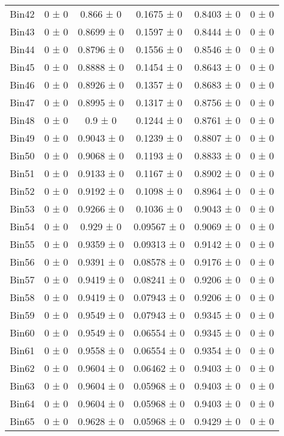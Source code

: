\begin{tabular}{@{\extracolsep{4pt}}lccccc@{}}
     Bin42 & 0 ± 0 & 0.866 ± 0 & 0.1675 ± 0 & 0.8403 ± 0 & 0 ± 0 \\ 
     Bin43 & 0 ± 0 & 0.8699 ± 0 & 0.1597 ± 0 & 0.8444 ± 0 & 0 ± 0 \\ 
     Bin44 & 0 ± 0 & 0.8796 ± 0 & 0.1556 ± 0 & 0.8546 ± 0 & 0 ± 0 \\ 
     Bin45 & 0 ± 0 & 0.8888 ± 0 & 0.1454 ± 0 & 0.8643 ± 0 & 0 ± 0 \\ 
     Bin46 & 0 ± 0 & 0.8926 ± 0 & 0.1357 ± 0 & 0.8683 ± 0 & 0 ± 0 \\ 
     Bin47 & 0 ± 0 & 0.8995 ± 0 & 0.1317 ± 0 & 0.8756 ± 0 & 0 ± 0 \\ 
     Bin48 & 0 ± 0 & 0.9 ± 0 & 0.1244 ± 0 & 0.8761 ± 0 & 0 ± 0 \\ 
     Bin49 & 0 ± 0 & 0.9043 ± 0 & 0.1239 ± 0 & 0.8807 ± 0 & 0 ± 0 \\ 
     Bin50 & 0 ± 0 & 0.9068 ± 0 & 0.1193 ± 0 & 0.8833 ± 0 & 0 ± 0 \\ 
     Bin51 & 0 ± 0 & 0.9133 ± 0 & 0.1167 ± 0 & 0.8902 ± 0 & 0 ± 0 \\ 
     Bin52 & 0 ± 0 & 0.9192 ± 0 & 0.1098 ± 0 & 0.8964 ± 0 & 0 ± 0 \\ 
     Bin53 & 0 ± 0 & 0.9266 ± 0 & 0.1036 ± 0 & 0.9043 ± 0 & 0 ± 0 \\ 
     Bin54 & 0 ± 0 & 0.929 ± 0 & 0.09567 ± 0 & 0.9069 ± 0 & 0 ± 0 \\ 
     Bin55 & 0 ± 0 & 0.9359 ± 0 & 0.09313 ± 0 & 0.9142 ± 0 & 0 ± 0 \\ 
     Bin56 & 0 ± 0 & 0.9391 ± 0 & 0.08578 ± 0 & 0.9176 ± 0 & 0 ± 0 \\ 
     Bin57 & 0 ± 0 & 0.9419 ± 0 & 0.08241 ± 0 & 0.9206 ± 0 & 0 ± 0 \\ 
     Bin58 & 0 ± 0 & 0.9419 ± 0 & 0.07943 ± 0 & 0.9206 ± 0 & 0 ± 0 \\ 
     Bin59 & 0 ± 0 & 0.9549 ± 0 & 0.07943 ± 0 & 0.9345 ± 0 & 0 ± 0 \\ 
     Bin60 & 0 ± 0 & 0.9549 ± 0 & 0.06554 ± 0 & 0.9345 ± 0 & 0 ± 0 \\ 
     Bin61 & 0 ± 0 & 0.9558 ± 0 & 0.06554 ± 0 & 0.9354 ± 0 & 0 ± 0 \\ 
     Bin62 & 0 ± 0 & 0.9604 ± 0 & 0.06462 ± 0 & 0.9403 ± 0 & 0 ± 0 \\ 
     Bin63 & 0 ± 0 & 0.9604 ± 0 & 0.05968 ± 0 & 0.9403 ± 0 & 0 ± 0 \\ 
     Bin64 & 0 ± 0 & 0.9604 ± 0 & 0.05968 ± 0 & 0.9403 ± 0 & 0 ± 0 \\ 
     Bin65 & 0 ± 0 & 0.9628 ± 0 & 0.05968 ± 0 & 0.9429 ± 0 & 0 ± 0 \\ 

\end{tabular}
